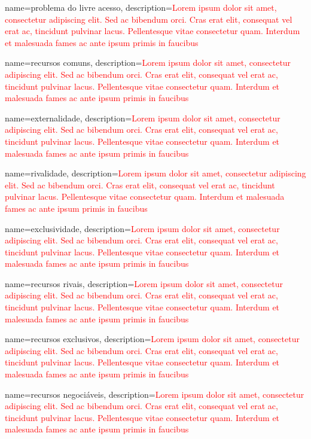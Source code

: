 {
	name=problema do livre acesso,
	description={\textcolor{red}{Lorem ipsum dolor sit amet, consectetur adipiscing elit. Sed ac bibendum orci. Cras erat elit, consequat vel erat ac, tincidunt pulvinar lacus. Pellentesque vitae consectetur quam. Interdum et malesuada fames ac ante ipsum primis in faucibus}}
}

{
	name=recursos comuns,
	description={\textcolor{red}{Lorem ipsum dolor sit amet, consectetur adipiscing elit. Sed ac bibendum orci. Cras erat elit, consequat vel erat ac, tincidunt pulvinar lacus. Pellentesque vitae consectetur quam. Interdum et malesuada fames ac ante ipsum primis in faucibus}}
}

{
	name=externalidade,
	description={\textcolor{red}{Lorem ipsum dolor sit amet, consectetur adipiscing elit. Sed ac bibendum orci. Cras erat elit, consequat vel erat ac, tincidunt pulvinar lacus. Pellentesque vitae consectetur quam. Interdum et malesuada fames ac ante ipsum primis in faucibus}}
}

{
	name=rivalidade,
	description={\textcolor{red}{Lorem ipsum dolor sit amet, consectetur adipiscing elit. Sed ac bibendum orci. Cras erat elit, consequat vel erat ac, tincidunt pulvinar lacus. Pellentesque vitae consectetur quam. Interdum et malesuada fames ac ante ipsum primis in faucibus}}
}

{
	name=exclusividade,
	description={\textcolor{red}{Lorem ipsum dolor sit amet, consectetur adipiscing elit. Sed ac bibendum orci. Cras erat elit, consequat vel erat ac, tincidunt pulvinar lacus. Pellentesque vitae consectetur quam. Interdum et malesuada fames ac ante ipsum primis in faucibus}}
}

{
	name=recursos rivais,
	description={\textcolor{red}{Lorem ipsum dolor sit amet, consectetur adipiscing elit. Sed ac bibendum orci. Cras erat elit, consequat vel erat ac, tincidunt pulvinar lacus. Pellentesque vitae consectetur quam. Interdum et malesuada fames ac ante ipsum primis in faucibus}}
}

{
	name=recursos exclusivos,
	description={\textcolor{red}{Lorem ipsum dolor sit amet, consectetur adipiscing elit. Sed ac bibendum orci. Cras erat elit, consequat vel erat ac, tincidunt pulvinar lacus. Pellentesque vitae consectetur quam. Interdum et malesuada fames ac ante ipsum primis in faucibus}}
}

{
	name=recursos negociáveis,
	description={\textcolor{red}{Lorem ipsum dolor sit amet, consectetur adipiscing elit. Sed ac bibendum orci. Cras erat elit, consequat vel erat ac, tincidunt pulvinar lacus. Pellentesque vitae consectetur quam. Interdum et malesuada fames ac ante ipsum primis in faucibus}}
}

